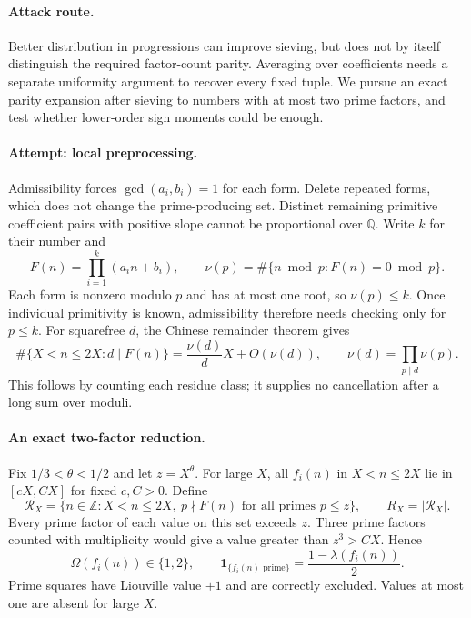 \documentclass[11pt,a4paper]{article}
\newcommand{\Z}{\mathbb{Z}}
\newcommand{\Q}{\mathbb{Q}}
\numberwithin{equation}{section}
\begin{document}
\paragraph{Attack route.}
Better distribution in progressions can improve sieving, but does not by itself distinguish the required factor-count parity. Averaging over coefficients needs a separate uniformity argument to recover every fixed tuple. We pursue an exact parity expansion after sieving to numbers with at most two prime factors, and test whether lower-order sign moments could be enough.

\paragraph{Attempt: local preprocessing.}
Admissibility forces $\gcd(a_i,b_i)=1$ for each form. Delete repeated forms, which does not change the prime-producing set. Distinct remaining primitive coefficient pairs with positive slope cannot be proportional over $\Q$. Write $k$ for their number and
\[
 F(n)=\prod_{i=1}^k(a_in+b_i),\qquad
 \nu(p)=\#\{n\bmod p:F(n)=0\bmod p\}.
\]
Each form is nonzero modulo $p$ and has at most one root, so $\nu(p)\le k$. Once individual primitivity is known, admissibility therefore needs checking only for $p\le k$. For squarefree $d$, the Chinese remainder theorem gives
\begin{equation}\label{r62:crt}
 \#\{X<n\le2X:d\mid F(n)\}
 =\frac{\nu(d)}dX+O(\nu(d)),\qquad
 \nu(d)=\prod_{p\mid d}\nu(p).
\end{equation}
This follows by counting each residue class; it supplies no cancellation after a long sum over moduli.

\paragraph{An exact two-factor reduction.}
Fix $1/3<\theta<1/2$ and let $z=X^\theta$. For large $X$, all $f_i(n)$ in $X<n\le2X$ lie in $[cX,CX]$ for fixed $c,C>0$. Define
\[
 \mathcal R_X=\{n\in\Z:X<n\le2X,\ p\nmid F(n)
                       \text{ for all primes }p\le z\},\qquad R_X=|\mathcal R_X|.
\]
Every prime factor of each value on this set exceeds $z$. Three prime factors counted with multiplicity would give a value greater than $z^3>CX$. Hence
\[
 \Omega(f_i(n))\in\{1,2\},\qquad
 \symbf{1}_{\{f_i(n)\text{ prime}\}}=\frac{1-\lambda(f_i(n))}{2}.
\]
Prime squares have Liouville value $+1$ and are correctly excluded. Values at most one are absent for large $X$.
\end{document}
